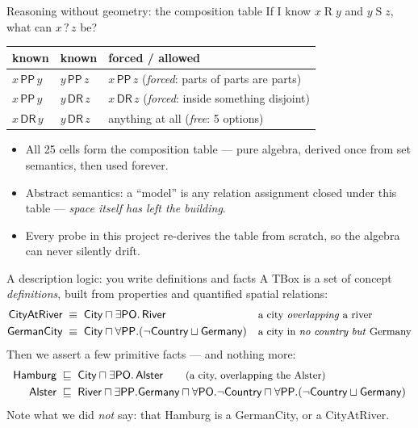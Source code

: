 \documentclass[aspectratio=169,11pt]{beamer}
\newcommand{\DR}{\mathsf{DR}}
\newcommand{\PO}{\mathsf{PO}}
\newcommand{\PP}{\mathsf{PP}}
\begin{document}
\begin{frame}{Reasoning without geometry: the composition table}
If I know $x \mathrel{R} y$ and $y \mathrel{S} z$, what can $x \mathrel{?} z$ be?
\begin{center}
\begin{tabular}{lll}
  \toprule
  known & known & forced / allowed\\
  \midrule
  $x\,\PP\,y$ & $y\,\PP\,z$ & $x\,\PP\,z$ \hfill (\emph{forced}: parts of parts are parts)\\
  $x\,\PP\,y$ & $y\,\DR\,z$ & $x\,\DR\,z$ \hfill (\emph{forced}: inside something disjoint)\\
  $x\,\DR\,y$ & $y\,\DR\,z$ & anything at all \hfill (\emph{free}: 5 options)\\
  \bottomrule
\end{tabular}
\end{center}
\vfill
\begin{itemize}
  \item All 25 cells form the \alert{composition table} --- pure algebra,
        derived once from set semantics, then used forever.
  \item \alert{Abstract semantics}: a ``model'' is any relation assignment
        closed under this table --- \emph{space itself has left the building}.
  \item Every probe in this project re-derives the table from scratch,
        so the algebra can never silently drift.
\end{itemize}
\end{frame}

\begin{frame}{A description logic: you write definitions and facts}
A \alert{TBox} is a set of concept \emph{definitions}, built from properties
and \alert{quantified spatial relations}:
\begin{align*}
  \textsf{CityAtRiver} &\;\equiv\; \textsf{City} \sqcap \exists\PO.\,\textsf{River}
      && \text{\small a city \emph{overlapping} a river}\\
  \textsf{GermanCity} &\;\equiv\; \textsf{City} \sqcap
      \forall\PP.(\neg\textsf{Country}\sqcup\textsf{Germany})
      && \text{\small a city in \emph{no country but} Germany}
\end{align*}
\vfill
Then we \alert{assert} a few primitive facts --- and nothing more:
\begin{align*}
  \textsf{Hamburg} &\;\sqsubseteq\; \textsf{City} \sqcap \exists\PO.\,\textsf{Alster}
      \qquad\text{\small(a city, overlapping the Alster)}\\
  \textsf{Alster} &\;\sqsubseteq\; \textsf{River} \sqcap \exists\PP.\textsf{Germany}
      \sqcap \forall\PO.\neg\textsf{Country}
      \sqcap \forall\PP.(\neg\textsf{Country}\sqcup\textsf{Germany})
\end{align*}
\vfill
{\small Note what we did \emph{not} say: that Hamburg is a
\textsf{GermanCity}, or a \textsf{CityAtRiver}.}
\end{frame}
\end{document}
